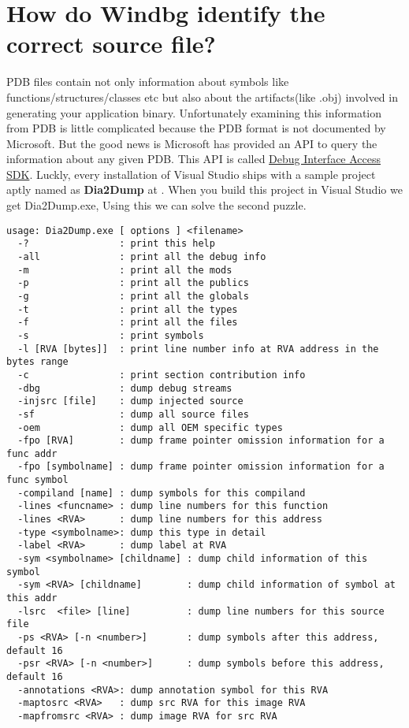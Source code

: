 \documentclass{article}
\begin{document}
\section{How do Windbg identify the correct source file?}
PDB files contain not only information about symbols like functions/structures/classes etc but also about the artifacts(like .obj) involved in generating your application binary. Unfortunately examining this information from PDB is little complicated because the PDB format is not documented by Microsoft. But the good news is Microsoft has provided an API to query the information about any given PDB. This API is called \href{https://docs.microsoft.com/en-us/visualstudio/debugger/debug-interface-access/debug-interface-access-sdk}{Debug Interface Access SDK}. Luckly, every installation of Visual Studio ships with a sample project aptly named as \textbf{Dia2Dump} at . When you build this project in Visual Studio we get Dia2Dump.exe, Using this we can solve the second puzzle.
\begin{verbatim}
usage: Dia2Dump.exe [ options ] <filename>
  -?                : print this help
  -all              : print all the debug info
  -m                : print all the mods
  -p                : print all the publics
  -g                : print all the globals
  -t                : print all the types
  -f                : print all the files
  -s                : print symbols
  -l [RVA [bytes]]  : print line number info at RVA address in the bytes range
  -c                : print section contribution info
  -dbg              : dump debug streams
  -injsrc [file]    : dump injected source
  -sf               : dump all source files
  -oem              : dump all OEM specific types
  -fpo [RVA]        : dump frame pointer omission information for a func addr
  -fpo [symbolname] : dump frame pointer omission information for a func symbol
  -compiland [name] : dump symbols for this compiland
  -lines <funcname> : dump line numbers for this function
  -lines <RVA>      : dump line numbers for this address
  -type <symbolname>: dump this type in detail
  -label <RVA>      : dump label at RVA
  -sym <symbolname> [childname] : dump child information of this symbol
  -sym <RVA> [childname]        : dump child information of symbol at this addr
  -lsrc  <file> [line]          : dump line numbers for this source file
  -ps <RVA> [-n <number>]       : dump symbols after this address, default 16
  -psr <RVA> [-n <number>]      : dump symbols before this address, default 16
  -annotations <RVA>: dump annotation symbol for this RVA
  -maptosrc <RVA>   : dump src RVA for this image RVA
  -mapfromsrc <RVA> : dump image RVA for src RVA
\end{verbatim}
\end{document}
